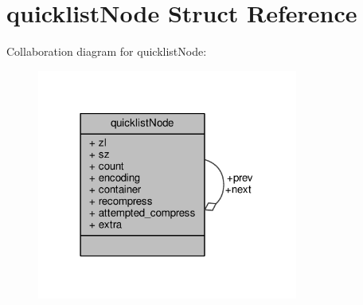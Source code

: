 \hypertarget{structquicklistNode}{}\section{quicklist\+Node Struct Reference}
\label{structquicklistNode}


Collaboration diagram for quicklist\+Node\+:\nopagebreak
\begin{figure}[H]
\begin{center}
\leavevmode
\includegraphics[width=243pt]{structquicklistNode__coll__graph}
\end{center}
\end{figure}

